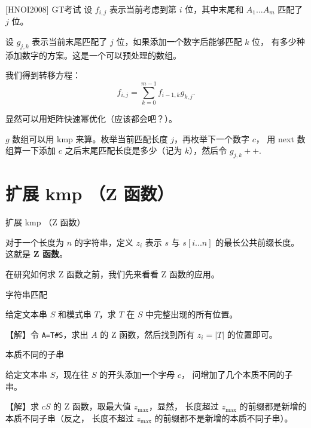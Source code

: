\documentclass{beamer}
\begin{document}
\begin{frame}{[HNOI2008] GT考试}
    \small 
    设 $f_{i,j}$ 表示当前考虑到第 $i$ 位，其中末尾和 $A_1...A_m$ 匹配了 $j$ 位。

    设 $g_{j,k}$ 表示当前末尾匹配了 $j$ 位，如果添加一个数字后能够匹配 $k$ 位，
    有多少种添加数字的方案。这是一个可以预处理的数组。

    \vspace{1em}\pause
    我们得到转移方程：
    \begin{equation*}
        f_{i,j}=\sum_{k=0}^{m-1} f_{i-1,k}g_{k,j}.
    \end{equation*}

    显然可以用矩阵快速幂优化（应该都会吧？）。

    \vspace{1em}\pause
    $g$ 数组可以用 kmp 来算。枚举当前匹配长度 $j$，再枚举下一个数字 $c$，
    用 next 数组算一下添加 $c$ 之后末尾匹配长度是多少（记为 $k$），然后令 $g_{j,k}++$.
\end{frame}

\section{扩展 kmp （Z 函数）}

\begin{frame}{扩展 kmp （Z 函数）}
    \small

    对于一个长度为 $n$ 的字符串，定义 $z_i$ 表示 $s$ 与 $s[i...n]$ 的最长公共前缀长度。
    这就是 \textbf{Z 函数}。

    \vspace{1em}
    在研究如何求 Z 函数之前，我们先来看看 Z 函数的应用。
\end{frame}

\begin{frame}[fragile]{字符串匹配}
    \small

    给定文本串 $S$ 和模式串 $T$，求 $T$ 在 $S$ 中完整出现的所有位置。

    \pause\vspace{1em}
    【解】令 \verb|A=T#S|，求出 $A$ 的 Z 函数，然后找到所有 $z_i=|T|$ 的位置即可。
\end{frame}

\begin{frame}[fragile]{本质不同的子串}
    \small

    给定文本串 $S$，现在往 $S$ 的开头添加一个字母 $c$，
    问增加了几个本质不同的子串。

    \pause\vspace{1em}
    【解】求 $cS$ 的 Z 函数，取最大值 $z_\text{max}$，显然，
    长度超过 $z_\text{max}$ 的前缀都是新增的本质不同子串（反之，
    长度不超过 $z_\text{max}$ 的前缀都不是新增的本质不同子串）。
\end{frame}
\end{document}
